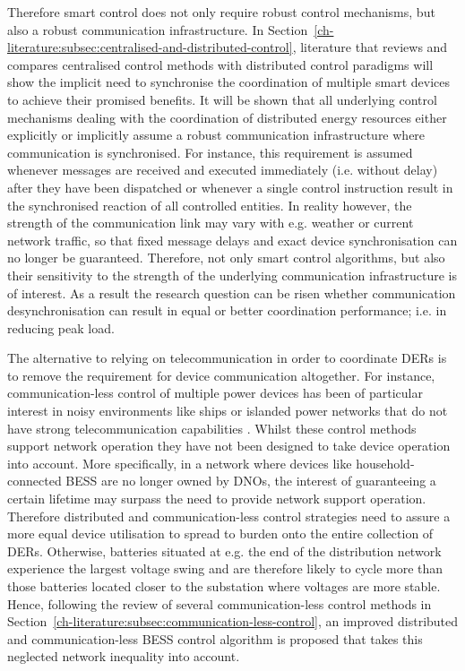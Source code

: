 Therefore smart control does not only require robust control mechanisms, but also a robust communication infrastructure.
In Section~\ref{ch-literature:subsec:centralised-and-distributed-control}, literature that reviews and compares centralised control methods with distributed control paradigms will show the implicit need to synchronise the coordination of multiple smart devices to achieve their promised benefits.
It will be shown that all underlying control mechanisms dealing with the coordination of distributed energy resources either explicitly or implicitly assume a robust communication infrastructure where communication is synchronised.
For instance, this requirement is assumed whenever messages are received and executed immediately (i.e. without delay) after they have been dispatched or whenever a single control instruction result in the synchronised reaction of all controlled entities.
In reality however, the strength of the communication link may vary with e.g. weather or current network traffic, so that fixed message delays and exact device synchronisation can no longer be guaranteed.
Therefore, not only smart control algorithms, but also their sensitivity to the strength of the underlying communication infrastructure is of interest.
As a result the research question can be risen whether communication desynchronisation can result in equal or better coordination performance; i.e. in reducing peak load.

The alternative to relying on telecommunication in order to coordinate DERs is to remove the requirement for device communication altogether.
For instance, communication-less control of multiple power devices has been of particular interest in noisy environments like ships \cite{Baldwin2004} or islanded power networks that do not have strong telecommunication capabilities \cite{Diaz2017}.
Whilst these control methods support network operation they have not been designed to take device operation into account.
More specifically, in a network where devices like household-connected BESS are no longer owned by DNOs, the interest of guaranteeing a certain lifetime may surpass the need to provide network support operation.
Therefore distributed and communication-less control strategies need to assure a more equal device utilisation to spread to burden onto the entire collection of DERs.
Otherwise, batteries situated at e.g. the end of the distribution network experience the largest voltage swing and are therefore likely to cycle more than those batteries located closer to the substation where voltages are more stable.
Hence, following the review of several communication-less control methods in Section~\ref{ch-literature:subsec:communication-less-control}, an improved distributed and communication-less BESS control algorithm is proposed that takes this neglected network inequality into account.
